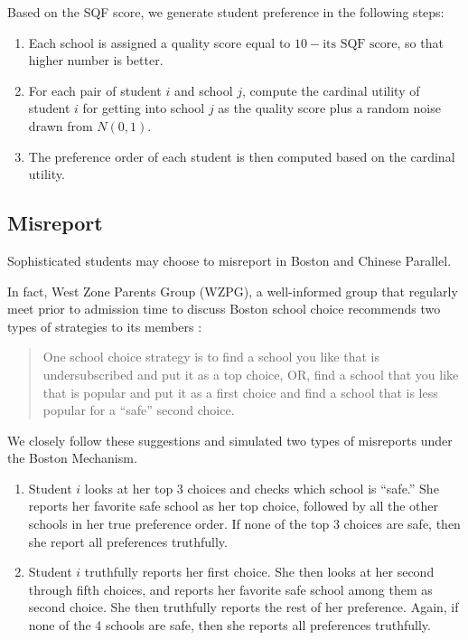 \documentclass[10pt, reqno]{amsart}
\begin{document}
Based on the SQF score, we generate student preference in the following steps:
\begin{enumerate}
  \item Each school is assigned a quality score equal to $10 - \text{its SQF score}$, so that higher number is better. 
  \item For each pair of student $i$ and school $j$, compute the cardinal utility of student $i$ for getting into school $j$ as the quality score plus a random noise drawn from $N(0,1)$. 
  \item The preference order of each student is then computed based on the cardinal utility. 
\end{enumerate}

\subsection{Misreport}

Sophisticated students may choose to misreport in Boston and Chinese Parallel. 

In fact, West Zone Parents Group (WZPG), a well-informed group that regularly meet prior to admission time to discuss Boston school choice recommends two types of strategies to its members \citep{pathak2008leveling}:
\begin{quote}
One school choice strategy is to find a school you like that is undersubscribed and put it as a top choice, OR, find a school that you like that is popular and put it as a first choice and find a school that is less popular for a “safe” second choice.    
\end{quote}

We closely follow these suggestions and simulated two types of misreports under the Boston Mechanism. 
\begin{enumerate}
  \item Student $i$ looks at her top 3 choices and checks which school is ``safe.'' She reports her favorite safe school as her top choice, followed by all the other schools in her true preference order. If none of the top 3 choices are safe, then she report all preferences truthfully. 
  \item Student $i$ truthfully reports her first choice. She then looks at her second through fifth choices, and reports her favorite safe school among them as second choice. She then truthfully reports the rest of her preference. Again, if none of the 4 schools are safe, then she reports all preferences truthfully. 
\end{enumerate}
\end{document}

